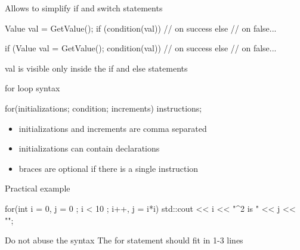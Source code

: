 \begin{frame}[fragile]
  Allows to simplify if and switch statements
  \begin{alertblock}{}
    \begin{cppcode*}{}
      Value val = GetValue();
      if (condition(val)) {
        // on success
      } else {
        // on false...
      }
    \end{cppcode*}
  \end{alertblock}
  \begin{exampleblock}{}
    \begin{cppcode*}{}
      if (Value val = GetValue(); condition(val)) {
        // on success
      } else {
        // on false...
      }
    \end{cppcode*}
    \vspace{-.1cm}
    val is visible only inside the if and else statements
  \end{exampleblock}
\end{frame}

\begin{frame}[fragile]
  \begin{block}{for loop syntax}
    \begin{cppcode*}{}
      for(initializations; condition; increments) {
        instructions;
      }
    \end{cppcode*}
    \vspace{-0.2cm}
    \begin{itemize}
      \item initializations and increments are comma separated
      \item initializations can contain declarations
      \item braces are optional if there is a single instruction
    \end{itemize}
  \end{block}
  \pause
  \begin{exampleblock}{Practical example}
    \begin{cppcode*}{}
      for(int i = 0, j = 0 ; i < 10 ; i++, j = i*i) {
        std::cout << i << "^2 is " << j << "\n";
      }
    \end{cppcode*}
  \end{exampleblock}
  \pause
  \begin{alertblock}{Do not abuse the syntax}
    The for statement should fit in 1-3 lines
  \end{alertblock}
\end{frame}

